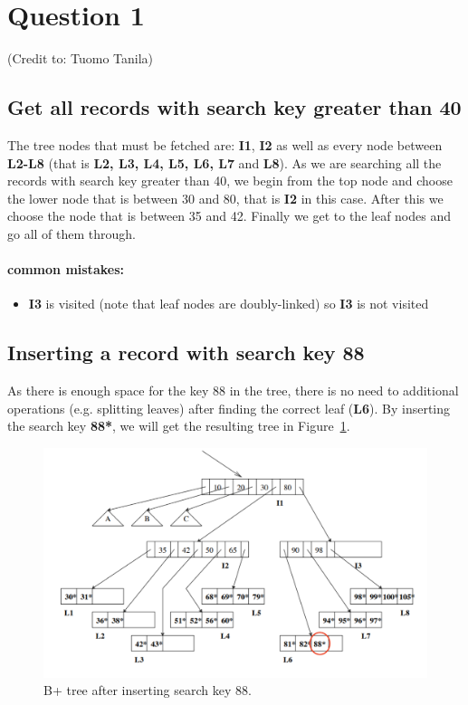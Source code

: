 \section{Question 1}\label{question-1}

(Credit to: Tuomo Tanila)

\subsection{Get all records with search key greater than 40}\label{section}

The tree nodes that must be fetched are: \textbf{I1}, \textbf{I2} as well as every node between \textbf{L2-L8} (that is \textbf{L2, L3, L4, L5, L6, L7} and \textbf{L8}). As we are searching all the records with search key greater than 40, we begin from the top node and choose the lower node that is between 30 and 80, that is \textbf{I2} in this case. After this we choose the node that is between 35 and 42. Finally we get to the leaf nodes and go all of them through.

\paragraph{common mistakes:}

\begin{itemize}
\tightlist
\item
  \textbf{I3} is visited (note that leaf nodes are doubly-linked) so \textbf{I3} is not visited
\end{itemize}


\subsection{Inserting a record with search key 88}\label{section-1}

As there is enough space for the key 88 in the tree, there is no need to additional operations (e.g. splitting leaves) after finding the correct leaf (\textbf{L6}). By inserting the search key \textbf{88*}, we will get the resulting tree in Figure~\ref{fig:q1-1}.

\begin{figure}[H]
  \centering
  \includegraphics[width=0.9\linewidth]{figs/q1-2.png}
  \caption{B+ tree after inserting search key 88.}
  \label{fig:q1-1}
\end{figure}


